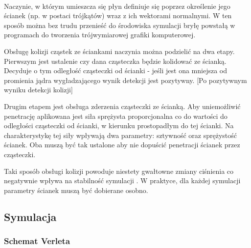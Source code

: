 \paragraph{}
\par
Naczynie, w którym umieszcza się płyn definiuje się poprzez określenie jego ścianek (np. w postaci trójkątów) wraz z ich wektorami normalnymi. W ten sposób można bez trudu przenieść do środowiska symulacji bryłę powstałą w programach do tworzenia trójwymiarowej grafiki komputerowej.
\par
Obsługę kolizji cząstek ze ściankami naczynia można podzielić na dwa etapy. Pierwszym jest ustalenie czy dana cząsteczka będzie kolidować ze ścianką. Decyduje o tym odległość cząsteczki od ścianki - jeśli jest ona mniejsza od promienia jądra wygładzającego wynik detekcji jest pozytywny.
[Po pozytywnym wyniku detekcji kolizji]
\par
Drugim etapem jest obsługa zderzenia cząsteczki ze ścianką. Aby uniemożliwić penetrację aplikowana jest siła sprężysta proporcjonalna co do wartości do odległości cząsteczki od ścianki, w kierunku prostopadłym do tej ścianki. Na charakterystykę tej siły wpływają dwa parametry: sztywność oraz sprężystość ścianek. Oba muszą być tak ustalone aby nie dopuścić penetracji ścianek przez cząsteczki.
\par
Taki sposób obsługi kolizji powoduje niestety gwałtowne zmiany ciśnienia co negatywnie wpływa na stabilność symulacji \cite{teschner10}. W praktyce, dla każdej symulacji parametry ścianek muszą być dobierane osobno.
\par

\subsection{Symulacja}
\label{subsec:integration_ss}


\subsubsection{Schemat Verleta}
